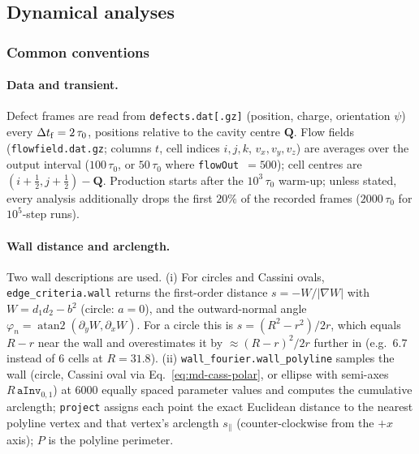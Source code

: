 \subsection{Dynamical analyses}
\label{sec:md-dyn}

\subsubsection{Common conventions}
\label{sec:md-conv}

\paragraph{Data and transient.} Defect frames are read from \texttt{defects.dat[.gz]} (position, charge, orientation $\psi$)
every $\Delta t_{\rm f}=2\,\tau_0$, positions relative to the cavity centre $\mathbf Q$. Flow fields (\texttt{flowfield.dat.gz};
columns $t$, cell indices $i,j,k$, $v_x,v_y,v_z$) are averages over the output interval ($100\,\tau_0$, or $50\,\tau_0$ where
\texttt{flowOut}~$=500$); cell centres are $(i+\tfrac12,j+\tfrac12)-\mathbf Q$. Production starts after the
$10^3\,\tau_0$ warm-up; unless stated, every analysis additionally drops the first $20\%$ of the recorded frames
($2000\,\tau_0$ for $10^5$-step runs).

\paragraph{Wall distance and arclength.} Two wall descriptions are used.
(i) For circles and Cassini ovals, \texttt{edge\_criteria.wall} returns the first-order distance $s=-W/|\nabla W|$ with
$W=d_1d_2-b^2$ (circle: $a=0$), and the outward-normal angle $\varphi_n=\operatorname{atan2}(\partial_yW,\partial_xW)$.
For a circle this is $s=(R^2-r^2)/2r$, which equals $R-r$ near the wall and overestimates it by $\approx(R-r)^2/2r$ further in
(e.g.\ $6.7$ instead of $6$ cells at $R=31.8$).
(ii) \texttt{wall\_fourier.wall\_polyline} samples the wall (circle, Cassini oval via Eq.~\eqref{eq:md-cass-polar}, or ellipse with
semi-axes $R\,\texttt{aInv}_{0,1}$) at $6000$ equally spaced parameter values and computes the cumulative arclength;
\texttt{project} assigns each point the exact Euclidean distance to the nearest polyline vertex and that vertex's arclength $s_\parallel$
(counter-clockwise from the $+x$ axis); $P$ is the polyline perimeter.

